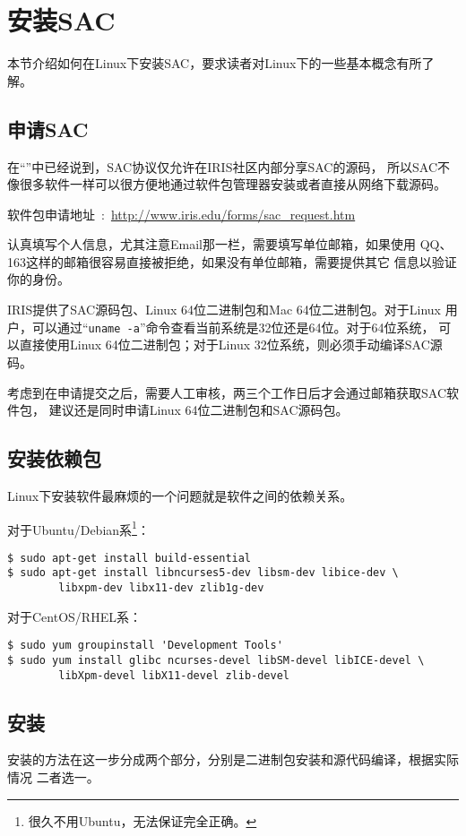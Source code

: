 \section{安装SAC}
本节介绍如何在Linux下安装SAC，要求读者对Linux下的一些基本概念有所了解。

\subsection*{申请SAC}
在``''中已经说到，SAC协议仅允许在IRIS社区内部分享SAC的源码，
所以SAC不像很多软件一样可以很方便地通过软件包管理器安装或者直接从网络下载源码。

软件包申请地址~:~\url{http://www.iris.edu/forms/sac\_request.htm}

认真填写个人信息，尤其注意Email那一栏，需要填写单位邮箱，如果使用
QQ、163这样的邮箱很容易直接被拒绝，如果没有单位邮箱，需要提供其它
信息以验证你的身份。

IRIS提供了SAC源码包、Linux 64位二进制包和Mac 64位二进制包。对于Linux
用户，可以通过``\lstinline{uname -a}''命令查看当前系统是32位还是64位。对于64位系统，
可以直接使用Linux 64位二进制包；对于Linux 32位系统，则必须手动编译SAC源码。

考虑到在申请提交之后，需要人工审核，两三个工作日后才会通过邮箱获取SAC软件包，
建议还是同时申请Linux 64位二进制包和SAC源码包。

\subsection*{安装依赖包}
Linux下安装软件最麻烦的一个问题就是软件之间的依赖关系。

对于Ubuntu/Debian系\footnote{很久不用Ubuntu，无法保证完全正确。}：
\begin{lstlisting}[style=Shell]
$ sudo apt-get install build-essential
$ sudo apt-get install libncurses5-dev libsm-dev libice-dev \
        libxpm-dev libx11-dev zlib1g-dev
\end{lstlisting}

对于CentOS/RHEL系：
\begin{lstlisting}[style=Shell]
$ sudo yum groupinstall 'Development Tools'
$ sudo yum install glibc ncurses-devel libSM-devel libICE-devel \
        libXpm-devel libX11-devel zlib-devel 
\end{lstlisting}

\subsection*{安装}
安装的方法在这一步分成两个部分，分别是二进制包安装和源代码编译，根据实际情况
二者选一。
